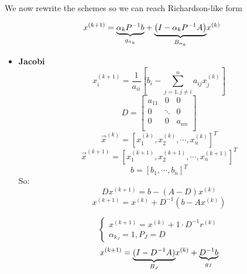     We now rewrite the schemes so we can reach Richardson-like form
    \begin{LARGE}
        $$
        x^{(k+1)}=
        \underlabel{\alpha_kP^{-1}b}{$g_{\alpha_k}$}+
        \underlabel{\left(
            I-\alpha_kP^{-1}A
            \right)}{$B_{\alpha_k}$}x^{(k)}
        $$
    \end{LARGE}
    \begin{itemize}
        \item \textbf{Jacobi}
        $$
        x_i^{(k+1)}=\frac{1}{a_{ii}}\left[
            b_i-\sum_{j=1,j\neq i}^n a_{ij}x_j^{(k)}
        \right]
        $$
        $$
        D=\begin{bmatrix}
            a_{11} & 0 & 0\\
            0 & \ddots & 0\\
            0 & 0 & a_{nn}\\
        \end{bmatrix}
        $$
        $$
        \overrightarrow{x}^{(k)}=\left[x_1^{(k)},x_2^{(k)},\cdots,x_n^{(k)}\right]^T
        $$
        $$
        \overrightarrow{x}^{(k+1)}=\left[x_1^{(k+1)},x_2^{(k+1)},\cdots,x_n^{(k+1)}\right]^T
        $$
        $$
        b=\left[b_1,\cdots,b_n\right]^T
        $$
        So:
        $$
        Dx^{(k+1)}=b-(A-D)x^{(k)}
        $$
        $$
        x^{(k+1)}=x^{(k)}+D^{-1}(b-Ax^{(k)})
        $$
        \begin{LARGE}
            $$
            \begin{cases}
                x^{(k+1)}=x^{(k)}+1\cdot D^{-1}r^{(k)}\\
                \alpha_{k_J}=1,P_J=D
            \end{cases}
            $$
            $$
            x^{(k+1)}=\underlabel{(I-D^{-1}A)}{
                $B_J$
            }x^{(k)}+\underlabel{D^{-1}b}{
                $g_J$
            }
            $$
        \end{LARGE}


\end{itemize}
